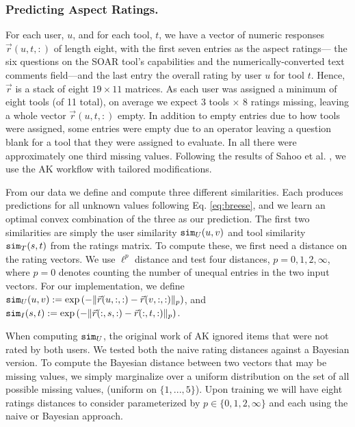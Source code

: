 \subsubsection{Predicting Aspect Ratings.}
For each user, $u$, and for each tool, $t$, we have a vector of numeric responses $\vec{r}(u,t,:)$ of length eight, with the first seven entries as the aspect ratings--- the six questions on the SOAR tool's capabilities and the numerically-converted text comments field---and the last entry the overall rating by user $u$ for tool $t$.
Hence, $\vec{r}$ is a stack of eight $19\times11$ matrices. 
As each user was assigned a minimum of eight tools (of 11 total), on average we expect 3 tools $\times$ 8 ratings missing, leaving a whole vector $\vec{r}(u,t,:)$ empty. 
In addition to empty entries due to how tools were assigned, some entries were empty due to an operator leaving a question blank for a tool that they were assigned to evaluate. 
In all there were approximately one third missing values. 
Following the results of Sahoo et al. \cite{sahoo2012research}, we use the AK workflow with tailored modifications. 

From our data we define and compute three different similarities. Each produces predictions for all unknown values following Eq. \ref{eq:breese}, and we learn an optimal convex combination of the three as our prediction. 
The first two similarities are simply the user similarity $\texttt{sim}_U(u,v)$ and tool similarity $\texttt{sim}_T(s,t)$ from the ratings matrix.
To compute these, we first need a distance on the rating vectors. 
We use $\ell^p$ distance and test four distances, $p = 0, 1, 2, \infty$, where $p=0$ denotes counting the number of unequal entries in the two input vectors.
For our implementation, we define 
$\texttt{sim}_U(u,v) := \exp{(-\| \vec{r}(u,:,:) - \vec{r}(v,:,:)\|_p)}$, and 
$\texttt{sim}_I(s,t) := \exp{(-\| \vec{r}(:,s,:) - \vec{r}(:,t,:)\|_p)}$. 

When computing $\texttt{sim}_U$, the original work of AK ignored items that were not rated by both users. 
We tested both the naive rating distances against a Bayesian version. 
To compute the Bayesian distance between two vectors that may be missing values, we simply marginalize over a uniform distribution on the set of all possible missing values, (uniform on $\{1,...,5\}$).
Upon training we will have eight ratings distances to consider parameterized by $p \in \{0, 1, 2, \infty\}$ and each using the naive or Bayesian approach. 


